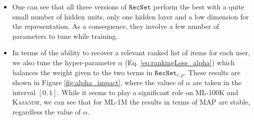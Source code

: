 \documentclass[10pt,journal,compsoc]{IEEEtran}
\newcommand{\ML}{\textsc{ML}}
\newcommand{\RecNet}{\texttt{RecNet}}
\newcommand{\kasandr}{\textsc{Kasandr}}
\newcommand{\cmmnt}[1]{}
\begin{document}
\begin{sloppypar}
\begin{itemize}
   \item One can see that all three versions of $\RecNet$ perform the best with a quite small number of hidden units, only one hidden layer and a low dimension for the representation. As a consequence, they involve a few number of parameters to tune while training.\cmmnt{ and present an interesting computational complexity compared to other state-of-the-art approaches.}
   \item In terms of the ability to recover a relevant ranked list of items for each user, we also tune the hyper-parameter $\alpha$ (Eq. \ref{eq:rankingLoss_alpha}) which balances the weight given to the two terms in $\RecNet_{c,p}$. These results are shown in Figure \ref{fig:alpha_impact}, where the values of $\alpha$ are taken in the interval $[0,1]$. While it seems to play a significant role on {\ML}-100K and {\kasandr}, we can see that for {\ML}-1M the results in terms of MAP are stable, regardless the value of $\alpha$.
\end{itemize}


\end{sloppypar}
\end{document}

